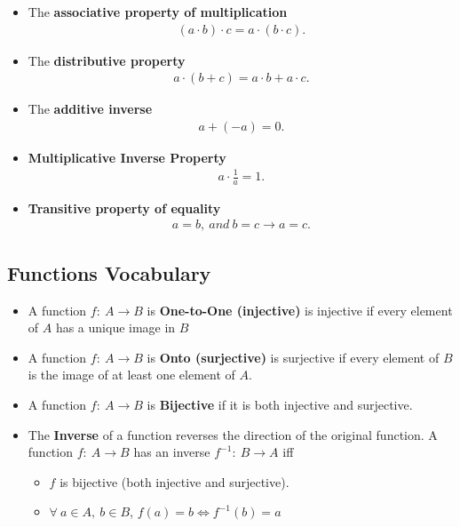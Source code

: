 \documentclass{report}
\begin{document}
\begin{itemize}
\begin{itemize}
            \item The \textbf{associative property of multiplication} 
              \begin{align*}
                (a \cdot b) \cdot c = a \cdot (b \cdot c) 
              .\end{align*}
            \item The \textbf{distributive property} 
              \begin{align*}
                a \cdot (b + c) = a \cdot b + a \cdot c 
              .\end{align*} 
            \item The \textbf{additive inverse} 
              \begin{align*}
                a + (-a) = 0
              .\end{align*}
            \item \textbf{Multiplicative Inverse Property}
              \begin{align*}
                a \cdot \frac{1}{a} = 1
              .\end{align*}
          \item \textbf{Transitive property of equality}
            \begin{align*}
              a=b,\ and\ b=c \rightarrow a=c
            .\end{align*}
        \end{itemize}
      \end{itemize}

      \pagebreak \bigbreak \noindent 
      \subsection{Functions Vocabulary}
      \bigbreak \noindent 
      \begin{itemize}
        \item A function $f:\ A \rightarrow B$ is \textbf{One-to-One (injective)} is injective if every element of $A$ has a unique image in $B$
        \item A function $f:\ A \rightarrow B$ is \textbf{Onto (surjective)}  is surjective if every element of $B$ is the image of at least one element of $A$.
        \item A function $f:\ A \rightarrow B$ is \textbf{Bijective} if it is both injective and surjective.
        \item The \textbf{Inverse} of a function reverses the direction of the original function. A function $f:\ A \rightarrow B$ has an inverse $f^{-1}:\ B \rightarrow A $ iff
          \begin{itemize}
            \item $f$ is bijective (both injective and surjective).
            \item $\forall\ a \in A,\ b \in B$, $f(a) = b \iff f^{-1}(b) = a $
          \end{itemize}
          \bigbreak \noindent 

      \end{itemize}
\end{document}
